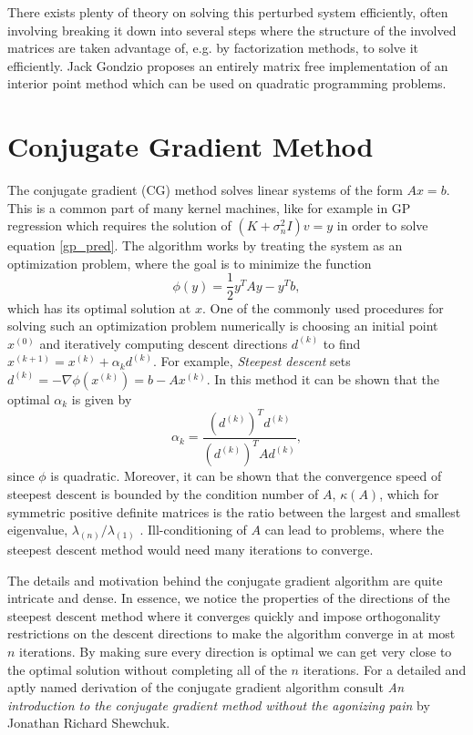 \documentclass{article}
\theoremstyle{plain}
\theoremstyle{definition}
\theoremstyle{remark}
\begin{document}
There exists plenty of theory on solving this perturbed system efficiently, often involving breaking it down into several steps where the structure of the involved matrices are taken advantage of, e.g. by factorization methods, to solve it efficiently.
Jack Gondzio \cite{gondzio} proposes an entirely matrix free implementation of an interior point method which can be used on quadratic programming problems.


\section{Conjugate Gradient Method}
The conjugate gradient (CG) method solves linear systems of the form $Ax = b$.
This is a common part of many kernel machines, like for example in GP regression which requires the solution of $(K + \sigma_n^2I)v = y$ in order to solve equation \eqref{gp_pred}.
The algorithm works by treating the system as an optimization problem, where the goal is to minimize the function 
\begin{equation}
        \label{potential}
        \phi (y) = \frac{1}{2}y^T Ay - y^Tb,
\end{equation}
which has its optimal solution at $x$.
One of the commonly used procedures for solving such an optimization problem numerically is choosing an initial point $x^{(0)}$ and iteratively computing descent directions $d^{(k)}$ to find $x^{(k+1)} = x^{(k)} + \alpha_k d^{(k)}$.
For example, \textit{Steepest descent} sets $d^{(k)} = -\nabla \phi (x^{(k)}) = b - Ax^{(k)}$. In this method it can be shown \cite{quarteroni} that the optimal $\alpha_k$ is given by
\begin{equation*}
        \alpha_k = \frac{(d^{(k)})^Td^{(k)}}{(d^{(k)})^TAd^{(k)}},
\end{equation*}
since $\phi$ is quadratic. Moreover, it can be shown that the convergence speed of steepest descent is bounded by the condition number of $A$, $\kappa(A)$, which for symmetric positive definite matrices is the ratio between the largest and smallest eigenvalue, $\lambda_{(n)}/\lambda_{(1)}$ \cite{shewchuk}. Ill-conditioning of $A$ can lead to problems, where the steepest descent method would need many iterations to converge.

The details and motivation behind the conjugate gradient algorithm are quite intricate and dense.
In essence, we notice the properties of the directions of the steepest descent method where it converges quickly and impose orthogonality restrictions on the descent directions to make the algorithm converge in at most $n$ iterations.
By making sure every direction is optimal we can get very close to the optimal solution without completing all of the $n$ iterations.
For a detailed and aptly named derivation of the conjugate gradient algorithm consult \textit{An introduction to the conjugate gradient method without the agonizing pain} \cite{shewchuk} by Jonathan Richard Shewchuk.
\end{document}
